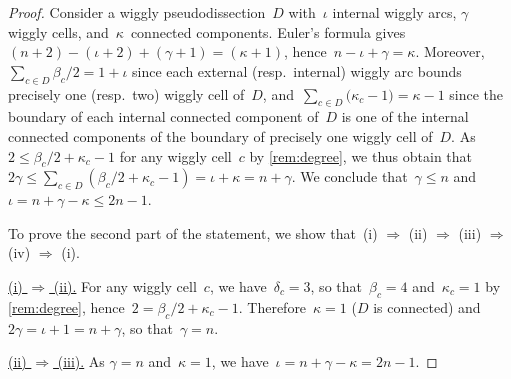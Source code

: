 \documentclass{amsart}
\theoremstyle{definition}
\newcommand{\para}[1]{\smallskip\noindent\uline{#1.}} %
\begin{document}
\begin{proof}
Consider a wiggly pseudodissection~$D$ with~$\iota$ internal wiggly arcs, $\gamma$ wiggly cells, and~$\kappa$~connected components.
Euler's formula gives~$(n+2)-(\iota+2)+(\gamma+1)=(\kappa+1)$, hence~$n - \iota + \gamma = \kappa$.
Moreover, $\sum_{c \in D} \beta_c/2 = 1+\iota$ since each external (resp.~internal) wiggly arc bounds precisely one (resp.~two) wiggly cell of~$D$, and~${\sum_{c \in D} \big( \kappa_c-1 \big) = \kappa-1}$ since the boundary of each internal connected component of~$D$ is one of the internal connected components of the boundary of precisely one wiggly cell of~$D$.
As~$2 \le \beta_c/2+\kappa_c-1$ for any wiggly cell~$c$ by \cref{rem:degree}, we thus obtain that~$2\gamma \le \sum_{c \in D} (\beta_c/2+\kappa_c-1) = \iota+\kappa = n+\gamma$.
We conclude that~$\gamma \le n$ and~$\iota = n+\gamma-\kappa \le 2n-1$.


To prove the second part of the statement, we show that~(i) $\Rightarrow$ (ii) $\Rightarrow$ (iii) $\Rightarrow$ (iv) $\Rightarrow$ (i).

\para{(i) $\Rightarrow$ (ii)}
For any wiggly cell~$c$, we have~$\delta_c = 3$, so that~$\beta_c = 4$ and~$\kappa_c = 1$ by \cref{rem:degree}, hence~$2 = \beta_c/2+\kappa_c-1$.
Therefore~$\kappa = 1$ ($D$ is connected) and~$2\gamma = \iota+1 = n+\gamma$, so that~$\gamma=n$.

\para{(ii) $\Rightarrow$ (iii)}
As $\gamma=n$ and~$\kappa=1$, we have~$\iota = n+\gamma-\kappa = 2n-1$.


\end{proof}
\end{document}
